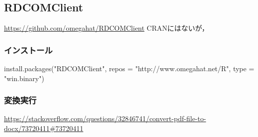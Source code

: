 \documentclass[
]{article}
\newenvironment{Shaded}{\begin{snugshade}}{\end{snugshade}}
\newcommand{\AttributeTok}[1]{\textcolor[rgb]{0.77,0.63,0.00}{#1}}
\newcommand{\ConstantTok}[1]{\textcolor[rgb]{0.00,0.00,0.00}{#1}}
\newcommand{\FunctionTok}[1]{\textcolor[rgb]{0.00,0.00,0.00}{#1}}
\newcommand{\NormalTok}[1]{#1}
\newcommand{\OtherTok}[1]{\textcolor[rgb]{0.56,0.35,0.01}{#1}}
\newcommand{\SpecialCharTok}[1]{\textcolor[rgb]{0.00,0.00,0.00}{#1}}
\newcommand{\StringTok}[1]{\textcolor[rgb]{0.31,0.60,0.02}{#1}}
\begin{document}
\hypertarget{rdcomclient}{%
\subsection{RDCOMClient}\label{rdcomclient}}

\url{https://github.com/omegahat/RDCOMClient}
CRANにはないが，

\hypertarget{ux30a4ux30f3ux30b9ux30c8ux30fcux30eb}{%
\subsubsection{インストール}\label{ux30a4ux30f3ux30b9ux30c8ux30fcux30eb}}

\begin{Shaded}
\begin{Highlighting}[]
\FunctionTok{install.packages}\NormalTok{(}\StringTok{"RDCOMClient"}\NormalTok{, }
  \AttributeTok{repos =} \StringTok{"http://www.omegahat.net/R"}\NormalTok{, }
  \AttributeTok{type =} \StringTok{"win.binary"}\NormalTok{)}
\end{Highlighting}
\end{Shaded}

\hypertarget{ux5909ux63dbux5b9fux884c}{%
\subsubsection{変換実行}\label{ux5909ux63dbux5b9fux884c}}

\url{https://stackoverflow.com/questions/32846741/convert-pdf-file-to-docx/73720411\#73720411}

\begin{Shaded}
\end{Shaded}
\end{document}
